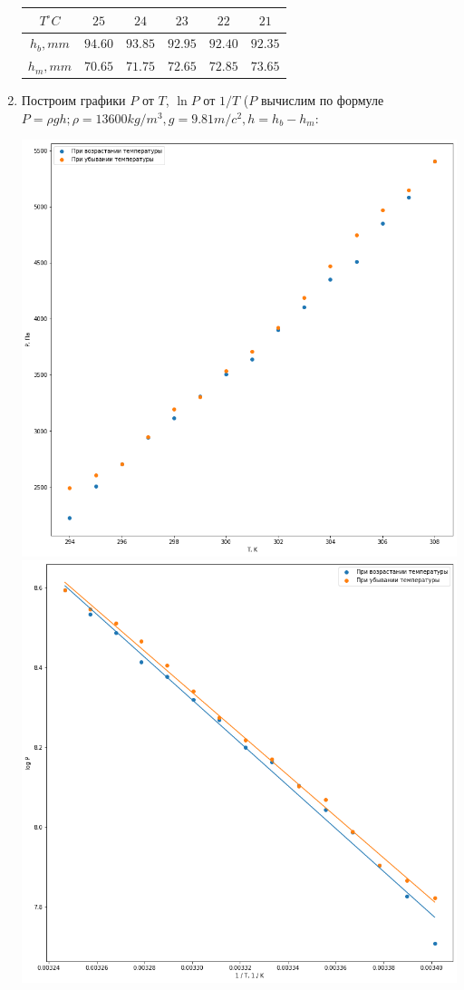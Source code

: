 \documentclass[12pt,a4paper]{article}
\begin{document}
\begin{enumerate}
			\begin{tabular}{| c | c | c | c | c | c |} \hline
				$T^\circ C$ & $25$ & $24$ & $23$ & $22$ & $21$ \\ \hline
				$h_b, mm$ & $94.60$ & $93.85$ & $92.95$ & $92.40$ & $92.35$ \\ \hline
				$h_m, mm$ & $70.65$ & $71.75$ & $72.65$ & $72.85$ & $73.65$ \\ \hline
			\end{tabular}
			
		\item Построим графики $P$ от $T$, $\ln P$ от $1 / T$ ($P$ вычислим по формуле $P = \rho g h; \rho = 13600 kg/m^3, g = 9.81 m/c^2, h = h_b - h_m$:	
		
		\includegraphics[scale=0.6]{pic2.png} \\
		
		\includegraphics[scale=0.6]{pic3.png} \\
		

\end{enumerate}
\end{document}
